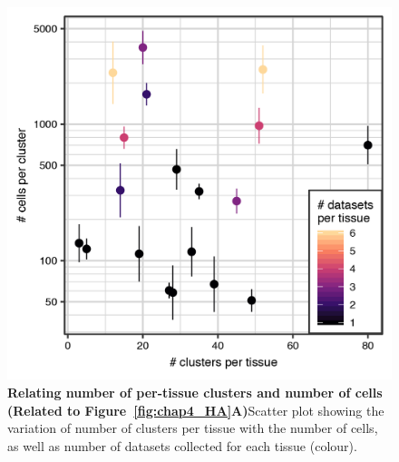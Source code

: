 \begin{figure}[ht!] 
\centering    
\includegraphics[scale=1.25]{Appendix2/Figs/tissue_cluster_dataset_numbers_HumanAtlas.png} %
\caption[Relating number of per-tissue clusters and number of cells]{\textbf{Relating number of per-tissue clusters and number of cells (Related to Figure~\ref{fig:chap4_HA}A)}\newline Scatter plot showing the variation of number of clusters per tissue with the number of cells, as well as number of datasets collected for each tissue (colour).}
\label{fig:appB_clustnumbs}
\end{figure}


